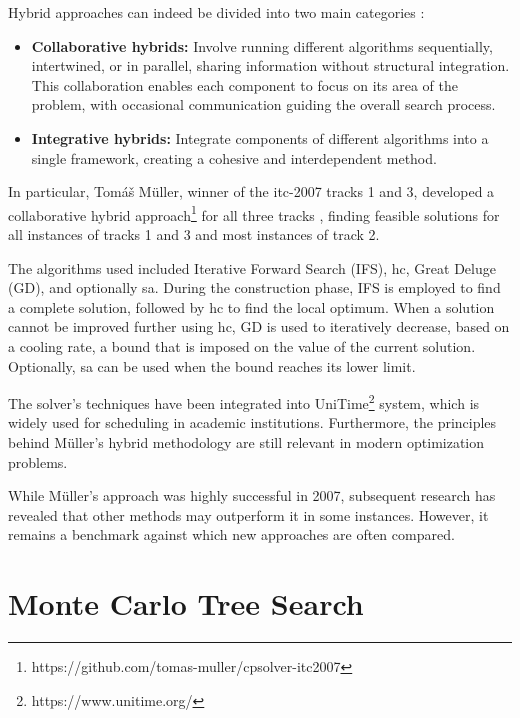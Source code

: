 Hybrid approaches can indeed be divided into two main categories \cite{abdipoor_meta-heuristic_2023}:

\begin{itemize}
\item \textbf{Collaborative hybrids:} Involve running different algorithms sequentially, intertwined, or in parallel, sharing information without structural integration. This collaboration enables each component to focus on its area of the problem, with occasional communication guiding the overall search process.

\item \textbf{Integrative hybrids:} Integrate components of different algorithms into a single framework, creating a cohesive and interdependent method.

\end{itemize}


In particular, Tomáš Müller, winner of the \ac{itc-2007} tracks 1 and 3, developed a collaborative hybrid approach\footnote{https://github.com/tomas-muller/cpsolver-itc2007} for all three tracks \cite{muller_itc2007}, finding feasible solutions for all instances of tracks 1 and 3 and most instances of track 2. 

The algorithms used included Iterative Forward Search (IFS), \ac{hc}, Great Deluge (GD), and optionally \ac{sa}. During the construction phase, IFS is employed to find a complete solution, followed by \ac{hc} to find the local optimum. When a solution cannot be improved further using \ac{hc}, GD is used to iteratively decrease, based on a cooling rate, a bound that is imposed on the value of the current solution. Optionally, \ac{sa} can be used when the bound reaches its lower limit.

The solver's techniques have been integrated into UniTime\footnote{https://www.unitime.org/} system, which is widely used for scheduling in academic institutions. Furthermore, the principles behind Müller's hybrid methodology are still relevant in modern optimization problems.

While Müller's approach was highly successful in 2007, subsequent research has revealed that other methods may outperform it in some instances. However, it remains a benchmark against which new approaches are often compared.

\section{Monte Carlo Tree Search}

